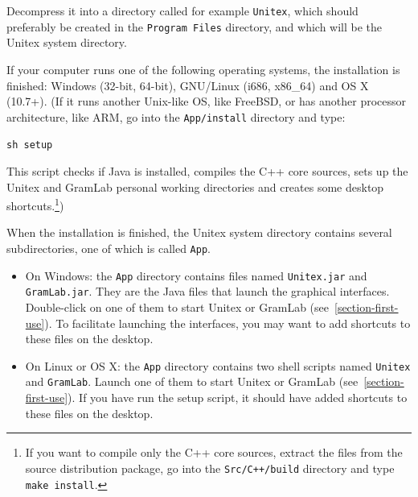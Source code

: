 \noindent Decompress it into a directory called for example {\tt Unitex\UnitexVersion{}}, which
should preferably be created in the \verb+Program Files+ directory,
and which will be the Unitex system directory.

\bigskip
\noindent If your computer runs one of the following operating systems, the installation is finished: Windows (32-bit, 64-bit), GNU/Linux (i686, x86\_64) and OS X (10.7+). (If it runs another Unix-like OS, like FreeBSD, or has another processor architecture, like ARM, go into the \verb+App/install+ directory and type:

\begin{flushleft}
\verb+sh setup+
\end{flushleft}

\noindent This script checks if Java is installed, compiles the C++ core sources, sets up the
Unitex and GramLab personal working directories and creates some desktop shortcuts.\footnote{If
you want to compile only the C++ core sources, extract the files from the source
distribution package, go into the {\tt Src/C++/build} directory and type {\tt make install}.})

\bigskip
\noindent When the installation is finished, the Unitex system directory contains several
subdirectories,  one  of which is called \verb+App+.
\begin{itemize}
\item On Windows: the \verb+App+ directory contains files named
\verb+Unitex.jar+ and \verb+GramLab.jar+. They are the Java files that
launch the graphical interfaces. Double-click on one of them to start Unitex or GramLab
(see~\ref{section-first-use}). To facilitate launching the interfaces, you may want to add shortcuts
to these files on the desktop.
\item On Linux or OS X: the \verb+App+ directory contains two
shell scripts named \verb+Unitex+ and \verb+GramLab+. Launch one of them
to start Unitex or GramLab (see~\ref{section-first-use}). If you have run the setup script, it should have added
shortcuts to these files on the desktop.
\end{itemize}

